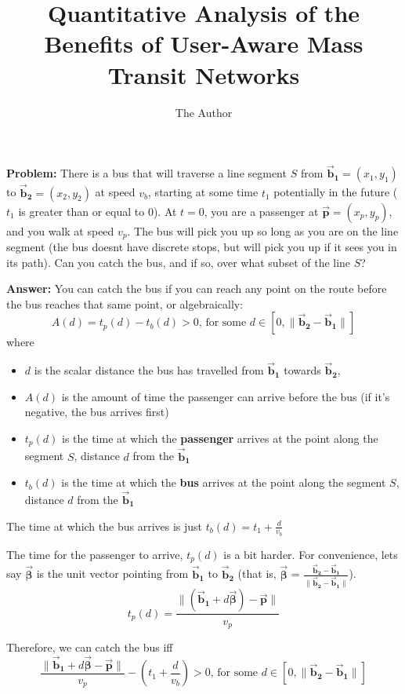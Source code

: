 \documentclass[11pt]{article} %
\title{Quantitative Analysis of the Benefits of User-Aware Mass Transit Networks}
\author{The Author}
\date{}
\begin{document}
\maketitle

\textbf{Problem: }There is a bus that will traverse a line segment $S$ from $\bm{\vec{b}_1} = (x_1, y_1)$ to  $\bm{\vec{b}_2} = (x_2, y_2)$ at speed $v_b$, starting at some time $t_1$ potentially in the future ($t_1$ is greater than or equal to 0). At $t=0$, you are a passenger at $\bm{\vec{p}} = (x_p, y_p)$, and you walk at speed $v_p$. The bus will pick you up so long as you are on the line segment (the bus doesnt have discrete stops, but will pick you up if it sees you in its path). Can you catch the bus, and if so, over what subset of the line $S$?

\vspace{0.5cm}
\noindent \textbf{Answer: } You can catch the bus if you can reach any point on the route before the bus reaches that same point, or algebraically:
$$A(d) =  t_p(d) - t_b(d) > 0 \mbox{, for some } d \in [0,  \|\bm{\vec{b}_2} - \bm{\vec{b}_1}\|] $$
where 
\begin{itemize}
\item $d$ is the scalar distance the bus has travelled from $\bm{\vec{b}_1}$ towards $\bm{\vec{b}_2}$,
\item $A(d)$ is the amount of time the passenger can arrive before the bus (if it's negative, the bus arrives first)
\item $t_p(d)$ is the time at which the \textbf{passenger} arrives at the point along the segment $S$, distance $d$ from the $\bm{\vec{b}_1}$
\item $t_b(d)$ is the time at which the \textbf{bus} arrives at the point along the segment $S$, distance $d$ from the $\bm{\vec{b}_1}$
\end{itemize}

The time at which the bus arrives is just $t_b(d) = t_1 + \frac{d}{v_b}$

The time for the passenger to arrive, $t_p(d)$ is a bit harder. 
For convenience, lets say  $\bm{\vec{\beta}}$ is the unit vector pointing from $\bm{\vec{b}_1}$ to $\bm{\vec{b}_2}$ (that is,  $\bm{\vec{\beta}}$ = $\frac{\bm{\vec{b}_2} - \bm{\vec{b}_1}}{\|\bm{\vec{b}_2} - \bm{\vec{b}_1}\|}$).
$$ t_p(d) = \frac{ \| (\bm{\vec{b}_1} + d\bm{\vec{\beta}}) - \bm{\vec{p}} \|} {v_p} $$

Therefore, we can catch the bus iff
$$ \frac{ \| \bm{\vec{b}_1} + d\bm{\vec{\beta}} - \bm{\vec{p}} \|} {v_p} - \left(t_1 + \frac{d}{v_b}\right) > 0 \mbox{, for some } d \in [0,  \|\bm{\vec{b}_2} - \bm{\vec{b}_1}\|] $$
\end{document}
